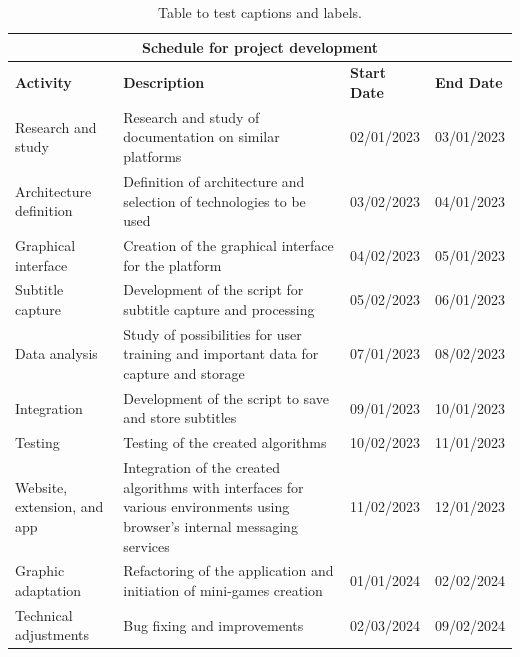 \documentclass[12pt]{article}
\begin{document}
\begin{table}
\centering

\begin{tabular}{ |p{3cm}|p{3cm}|p{3cm}|p{3cm}|  }

 \hline
 \multicolumn{4}{|c|}{Schedule for project development} \\
 \hline
 \hline

\textbf{Activity} & \textbf{Description} & \textbf{Start Date} & \textbf{End Date} \\ 
\hline

Research and study & Research and study of documentation on similar platforms & 02/01/2023 & 03/01/2023 \\ \hline
Architecture definition & Definition of architecture and selection of technologies to be used & 03/02/2023 & 04/01/2023 \\ \hline
Graphical interface & Creation of the graphical interface for the platform & 04/02/2023 & 05/01/2023 \\ \hline
Subtitle capture & Development of the script for subtitle capture and processing & 05/02/2023 & 06/01/2023 \\ \hline
Data analysis & Study of possibilities for user training and important data for capture and storage & 07/01/2023 & 08/02/2023 \\ \hline
Integration & Development of the script to save and store subtitles & 09/01/2023 & 10/01/2023 \\  \hline
Testing & Testing of the created algorithms & 10/02/2023 & 11/01/2023 \\  \hline
Website, extension, and app & Integration of the created algorithms with interfaces for various environments using browser's internal messaging services & 11/02/2023 & 12/01/2023 \\ \hline
Graphic adaptation & Refactoring of the application and initiation of mini-games creation & 01/01/2024 & 02/02/2024 \\  \hline
Technical adjustments & Bug fixing and improvements & 02/03/2024 & 09/02/2024  \\
 \hline
 \end{tabular}
\caption{Table to test captions and labels.}

\label{table:1}
\end{table}

 
\end{document}
